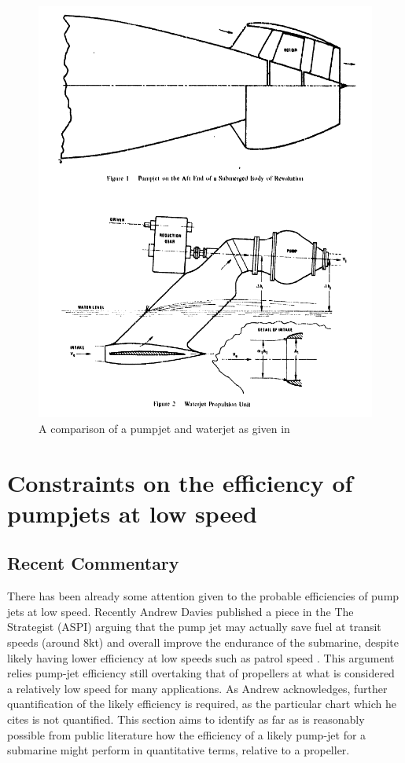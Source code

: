 \documentclass{article}\usepackage[]{graphicx}\usepackage[]{color}
\begin{document}
\begin{figure}
\includegraphics[width=\textwidth]{PumpjetWaterjet.png}
\caption{A comparison of a pumpjet and waterjet as given in \cite{wislicenus1973}}
\label{fig:PumpjetWaterjet.png}
\end{figure}

\section{Constraints on the efficiency of pumpjets at low speed}

\subsection{Recent Commentary}
There has been already some attention given to the probable efficiencies of pump jets at low speed. Recently Andrew Davies published a piece in the The Strategist (ASPI) arguing that the pump jet may actually save fuel at transit speeds (around 8kt) and overall improve the endurance of the submarine, despite likely having lower efficiency at low speeds such as patrol speed \parencite{davies2017}.  This argument relies pump-jet efficiency still overtaking that of propellers at what is considered a relatively low speed for many applications.  As Andrew acknowledges, further quantification of the likely efficiency is required, as the particular chart which he cites is not quantified.  This section aims to identify as far as is reasonably possible from public literature how the efficiency of a likely pump-jet for a submarine might perform in quantitative terms, relative to a propeller.
\end{document}
